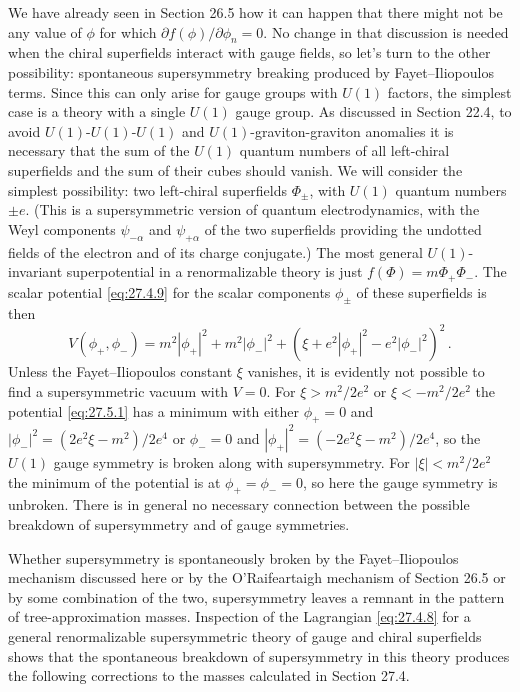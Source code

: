 We have already seen in Section 26.5 how it can happen that there might not
be any value of \(\phi\) for which \(\partial f(\phi)/\partial\phi_n=0\).
No change in that discussion is needed when the chiral superfields interact
with gauge fields, so let's turn to the other possibility: spontaneous
supersymmetry breaking produced by Fayet--Iliopoulos terms. Since this can
only arise for gauge groups with \(U(1)\) factors, the simplest case is a
theory with a single \(U(1)\) gauge group. As discussed in Section 22.4, to
avoid \(U(1)\)-\(U(1)\)-\(U(1)\) and \(U(1)\)-graviton-graviton anomalies
it is necessary that the sum of the \(U(1)\) quantum numbers of all
left-chiral superfields and the sum of their cubes should vanish. We will
consider the simplest possibility: two left-chiral superfields \(\Phi_\pm\),
with \(U(1)\) quantum numbers \(\pm e\). (This is a supersymmetric version
of quantum electrodynamics, with the Weyl components
\(\psi_{-\alpha}\) and \(\psi_{+\alpha}\) of the two superfields providing
the undotted fields of the electron and of its charge conjugate.) The most general
\(U(1)\)-invariant superpotential in a renormalizable theory is just
\(f(\Phi)=m\Phi_+\Phi_-\). The scalar potential \eqref{eq:27.4.9} for the
scalar components \(\phi_\pm\) of these superfields is then
\begin{equation}
  V(\phi_+,\phi_-)
  =m^2|\phi_+|^2+m^2|\phi_-|^2
  +\left(\xi+e^2|\phi_+|^2-e^2|\phi_-|^2\right)^2\,.
  \tag{27.5.1}\label{eq:27.5.1}
\end{equation}
Unless the Fayet--Iliopoulos constant \(\xi\) vanishes, it is evidently not
possible to find a supersymmetric vacuum with \(V=0\). For
\(\xi>m^2/2e^2\) or \(\xi<-m^2/2e^2\) the potential \eqref{eq:27.5.1} has
a minimum with either \(\phi_+=0\) and
\(|\phi_-|^2=(2e^2\xi-m^2)/2e^4\) or \(\phi_-=0\) and
\(|\phi_+|^2=(-2e^2\xi-m^2)/2e^4\), so the \(U(1)\) gauge symmetry is
broken along with supersymmetry. For \(|\xi|<m^2/2e^2\) the minimum of the
potential is at \(\phi_+=\phi_-=0\), so here the gauge symmetry is unbroken.
There is in general no necessary connection between the possible breakdown
of supersymmetry and of gauge symmetries.

Whether supersymmetry is spontaneously broken by the Fayet--Iliopoulos
mechanism discussed here or by the O'Raifeartaigh mechanism of Section 26.5
or by some combination of the two, supersymmetry leaves a remnant in the
pattern of tree-approximation masses. Inspection of the Lagrangian
\eqref{eq:27.4.8} for a general renormalizable supersymmetric theory of gauge
and chiral superfields shows that the spontaneous breakdown of
supersymmetry in this theory produces the following corrections to the
masses calculated in Section 27.4.

